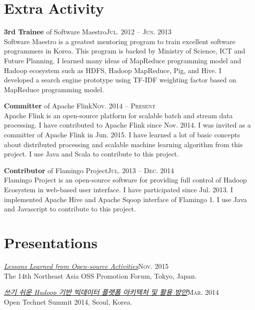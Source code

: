 \documentclass[11pt,a4paper]{article}
\renewenvironment{itemize}{
  \begin{list}{}{
    \setlength{\leftmargin}{1.5em}
    \setlength{\itemsep}{0.5em}
    \setlength{\parskip}{0pt}
    \setlength{\parsep}{0.25em}
  }
}{
  \end{list}
}
\begin{document}
\section*{Extra Activity}
\begin{itemize}
  \item \textbf{3rd Trainee} of Software Maestro\hfill\textsc{Jul. 2012 -- Jun. 2013}\\
        Software Maestro is a greatest mentoring program to train excellent software programmers in Korea. This program is backed by Ministry of Science, ICT and Future Planning. I learned many ideas of MapReduce programming model and Hadoop ecosystem such as HDFS, Hadoop MapReduce, Pig, and Hive. I developed a search engine prototype using TF-IDF weighting factor based on MapReduce programming model.
  \item \textbf{Committer} of Apache Flink\hfill\textsc{Nov. 2014 -- Present}\\
        Apache Flink is an open-source platform for scalable batch and stream data processing. I have contributed to Apache Flink since Nov. 2014. I was invited as a committer of Apache Flink in Jun. 2015. I have learned a lot of basic concepts about distributed processing and scalable machine learning algorithm from this project. I use Java and Scala to contribute to this project.
  \item \textbf{Contributor} of Flamingo Project\hfill\textsc{Jul. 2013 -- Dec. 2014}\\
        Flamingo Project is an open-source software for providing full control of Hadoop Ecosystem in web-based user interface. I have participated since Jul. 2013. I implemented Apache Hive and Apache Sqoop interface of Flamingo 1. I use Java and Javascript to contribute to this project.
\end{itemize}

\section*{Presentations}
\begin{itemize}
  \item \href{http://j.mp/cjkossforum-2015-park}{\textit{Lessons Learned from Open-source Activities}}\hfill\textsc{Nov. 2015}\\
        The 14th Northeast Asia OSS Promotion Forum, Tokyo, Japan.
  \item \href{http://j.mp/ots-2014-park}{\textit{쓰기 쉬운 Hadoop 기반 빅데이터 플랫폼 아키텍처 및 활용 방안}}\hfill\textsc{Mar. 2014}\\
        Open Technet Summit 2014, Seoul, Korea.
\end{itemize}
\end{document}

